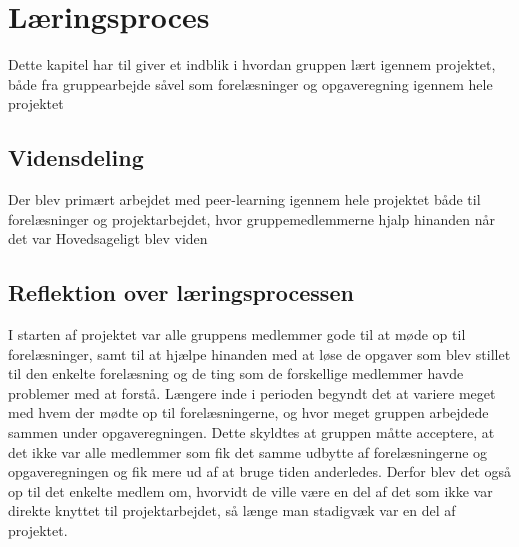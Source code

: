 \chapter{Læringsproces}\label{Laeringsproces}
Dette kapitel har til giver et indblik i hvordan gruppen lært igennem projektet, både fra gruppearbejde såvel som forelæsninger og opgaveregning igennem hele projektet

\section{Vidensdeling}\label{Vidensdeling}
Der blev primært arbejdet med peer-learning igennem hele projektet både til forelæsninger og projektarbejdet, hvor gruppemedlemmerne hjalp hinanden når det var
Hovedsageligt blev viden

\section{Reflektion over læringsprocessen}\label{Reflektion-over-laeringsprocessen}
I starten af projektet var alle gruppens medlemmer gode til at møde op til forelæsninger, samt til at hjælpe hinanden med at løse de opgaver som blev stillet til den enkelte forelæsning og de ting som de forskellige medlemmer havde problemer med at forstå. Længere inde i perioden begyndt det at variere meget med hvem der mødte op til forelæsningerne, og hvor meget gruppen arbejdede sammen under opgaveregningen. Dette skyldtes at gruppen måtte acceptere, at det ikke var alle medlemmer som fik det samme udbytte af forelæsningerne og opgaveregningen og fik mere ud af at bruge tiden anderledes. Derfor blev det også op til det enkelte medlem om, hvorvidt de ville være en del af det som ikke var direkte knyttet til projektarbejdet, så længe man stadigvæk var en del af projektet.
